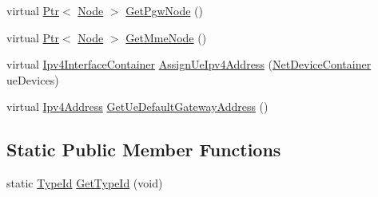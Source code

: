 \begin{DoxyCompactItemize}
\item 
virtual \hyperlink{classns3_1_1Ptr}{Ptr}$<$ \hyperlink{classns3_1_1Node}{Node} $>$ \hyperlink{classns3_1_1PointToPointEpcHelper_a828ac04ae81b0e323f9ccfc08bcacf21}{Get\+Pgw\+Node} ()
\item 
virtual \hyperlink{classns3_1_1Ptr}{Ptr}$<$ \hyperlink{classns3_1_1Node}{Node} $>$ \hyperlink{classns3_1_1PointToPointEpcHelper_a30e12f2f629629130df8b943976bd85b}{Get\+Mme\+Node} ()
\item 
virtual \hyperlink{classns3_1_1Ipv4InterfaceContainer}{Ipv4\+Interface\+Container} \hyperlink{classns3_1_1PointToPointEpcHelper_a11102d32127163fdcc47c44623d4f0cc}{Assign\+Ue\+Ipv4\+Address} (\hyperlink{classns3_1_1NetDeviceContainer}{Net\+Device\+Container} ue\+Devices)
\item 
virtual \hyperlink{classns3_1_1Ipv4Address}{Ipv4\+Address} \hyperlink{classns3_1_1PointToPointEpcHelper_a9160d83b92d5ea373abcd627f5d784f5}{Get\+Ue\+Default\+Gateway\+Address} ()
\end{DoxyCompactItemize}
\subsection*{Static Public Member Functions}
\begin{DoxyCompactItemize}
\item 
static \hyperlink{classns3_1_1TypeId}{Type\+Id} \hyperlink{classns3_1_1PointToPointEpcHelper_a47b968da010b784487a99cf20b1867cf}{Get\+Type\+Id} (void)
\end{DoxyCompactItemize}
